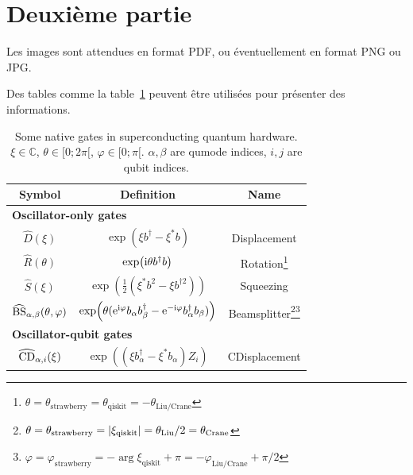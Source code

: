 \documentclass[
 reprint,
 unsortedaddress,
 preprintnumbers,
 nobibnotes,
 nofootinbib,
 longbibliography,
 amsmath,amssymb,
 aps,pra,
 onecolumn
]{revtex4-2}
\begin{document}
\section{Deuxième partie}

Les images sont attendues en format PDF, ou éventuellement en format PNG ou JPG.


Des tables comme la table~\ref{tab:gates} peuvent être utilisées pour présenter des informations.

\begin{table}[ht]
\begin{ruledtabular}
    \centering
    \begin{tabular}{ccc}
        Symbol & Definition & Name \\ \hline
        \multicolumn{3}{l}{\bf Oscillator-only gates} \\ \hline
        $\hat{D} (\xi)$ & $\exp( \xi  b^\dag - \xi^\ast b )$ & Displacement \\
        $\hat{R} (\theta)$ & $\exp( {\rm i} \theta  b^\dag b )$ & Rotation\footnote{$\theta = \theta_\text{strawberry} = \theta_\text{qiskit} = -\theta_\text{Liu/Crane}$} \\
        $\hat{S} (\xi)$ & $\exp( \frac{1}{2} (\xi^\ast  b^2 - \xi b^{\dag2}) )$ & Squeezing \\
        $\widehat{\rm BS}_{\alpha,\beta} (\theta,\varphi)$ & $\exp( \theta ( {\rm e}^{{\rm i}\varphi} b_\alpha b_\beta^\dag - {\rm e}^{-{\rm i}\varphi} b_\alpha^\dag b_\beta) )$ & Beamsplitter\footnote{$\theta = \theta_\text{strawberry} = \abs{\xi_\text{qiskit}} = \theta_\text{Liu}/2 = \theta_\text{Crane}$}\footnote{$\varphi = \varphi_\text{strawberry} = - \arg{\xi_\text{qiskit}} + \pi = - \varphi_\text{Liu/Crane} + \pi/2$} \\ \hline
        \multicolumn{3}{l}{{\bf Oscillator-qubit gates}} \\ \hline
        $\widehat{\rm CD}_{\alpha,i} (\xi)$ & $\exp( (\xi  b_\alpha^\dag - \xi^\ast b_\alpha) Z_i )$ & CDisplacement
    \end{tabular}
    \caption{Some native gates in superconducting quantum hardware. $\xi\in\mathbb{C}$, $\theta\in [0;2\pi[$, $\varphi\in[0;\pi[$. $\alpha,\beta$ are qumode indices, $i,j$ are qubit indices.}
    \label{tab:gates}
\end{ruledtabular}
\end{table}
\end{document}
